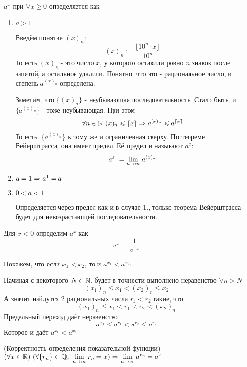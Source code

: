 \begin{definition}
	$a^x$ при $\forall x \ge 0$ определяется как
	\begin{enumerate}
		\item $a > 1$
		
		Введём понятие $(x)_n$:
		\[
			(x)_n := \frac{\lfloor10^n \cdot x\rfloor}{10^n}
		\]
		То есть $(x)_n$ - это число $x$, у которого оставили ровно $n$ знаков после запятой, а остальное удалили. Понятно, что это - рациональное число, и степень $a^{(x)_n}$ определена.
		
		Заметим, что $\{(x)_n\}$ - неубывающая последовательность. Стало быть, и $\{a^{(x)_n}\}$ - тоже неубывающая. При этом
		\[
			\forall n \in \mathbb{N}\ (x)_n \leqslant \lceil x \rceil \Rightarrow a^{(x)_n} \leqslant a^{\lceil x \rceil}
		\]
		То есть, $\{a^{(x)_n}\}$ к тому же и ограниченная сверху. По теореме Вейерштрасса, она имеет предел. Её предел и называют $a^x$:
		\[
			a^x := \lim\limits_{n \to \infty} a^{(x)_n}
		\]
		
		\item $a = 1 \Rightarrow a^1 = a$
		
		\item $0 < a < 1$
		
		Определяется через предел как и в случае 1., только теорема Вейерштрасса будет для невозрастающей последовательности.
	\end{enumerate}

	Для $x < 0$ определим $a^x$ как
	\[
		a^x = \frac{1}{a^{-x}}
	\]
	
	Покажем, что если $x_1 < x_2$, то и $a^{x_1} < a^{x_2}$:
	
	Начиная с некоторого $N \in \mathbb{N}$, будет в точности выполнено неравенство $\forall n > N$
	\[
		(x_1)_n \le x_1 < (x_2)_n \le x_2 
	\]
	А значит найдутся 2 рациональных числа $r_1 < r_2$ такие, что
	\[
		(x_1)_n \le x_1 < r_1 < r_2 < (x_2)_n
	\]
	Предельный переход даёт неравенство
	\[
		a^{x_1} \le a^{r_1} < a^{r_2} \le a^{x_2}
	\]
	Которое и даёт $a^{x_1} < a^{x_2}$
\end{definition}

\begin{lemma} (Корректность определения показательной функции)
	$(\forall x \in \R)\ (\forall \{r_n\} \subset \Q,\ \liml_{n \to \infty} r_n = x) \Ra \liml_{n \to \infty} a^{r_n} = a^x$
\end{lemma}


